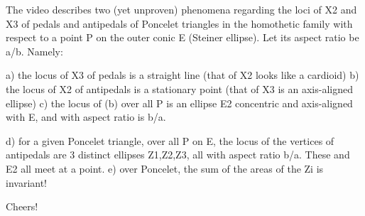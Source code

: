 The video describes two (yet unproven) phenomena regarding the loci of X2 and X3 of pedals and antipedals of Poncelet triangles in the homothetic family with respect to a point P on the outer conic E (Steiner ellipse). Let its aspect ratio be a/b. Namely:

a) the locus of X3 of pedals is a straight line (that of X2 looks like a cardioid)
b) the locus of X2 of antipedals is a stationary point (that of X3 is an axis-aligned ellipse)
c) the locus of (b) over all P is an ellipse E2 concentric and axis-aligned with E, and with aspect ratio is b/a.

d) for a given Poncelet triangle, over all P on E, the locus of the vertices of antipedals are 3 distinct ellipses Z1,Z2,Z3, all with aspect ratio b/a. These and E2 all meet at a point. 
e) over Poncelet, the sum of the areas of the Zi is invariant!

Cheers!
